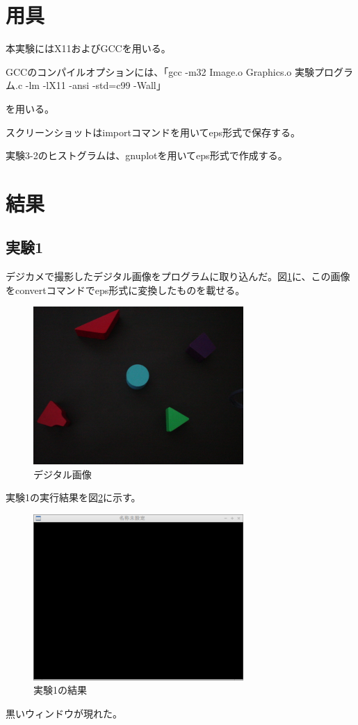 \documentclass{jarticle}[2012/05/15]
\begin{document}
\section{用具}
本実験にはX11およびGCCを用いる。\par
GCCのコンパイルオプションには、「gcc -m32 Image.o Graphics.o 実験プログラム.c -lm -lX11 -ansi -std=c99 -Wall」\par
を用いる。\par
スクリーンショットはimportコマンドを用いてeps形式で保存する。\par
実験3-2のヒストグラムは、gnuplotを用いてeps形式で作成する。\par
\pagebreak

\section{結果}
\subsection{実験1}
デジカメで撮影したデジタル画像をプログラムに取り込んだ。図\ref{source}に、この画像をconvertコマンドでeps形式に変換したものを載せる。\par
\begin{figure}[htbp]
  \centering
  \includegraphics[width=8cm]{DSC00062.eps}
  \caption{デジタル画像} \label{source}
\end{figure}
実験1の実行結果を図\ref{kadai01}に示す。\par
\pagebreak
\begin{figure}[htbp]
  \centering
  \includegraphics[width=8cm]{kadai01.eps}
  \caption{実験1の結果} \label{kadai01}
\end{figure}
黒いウィンドウが現れた。\par
\pagebreak
\end{document}
